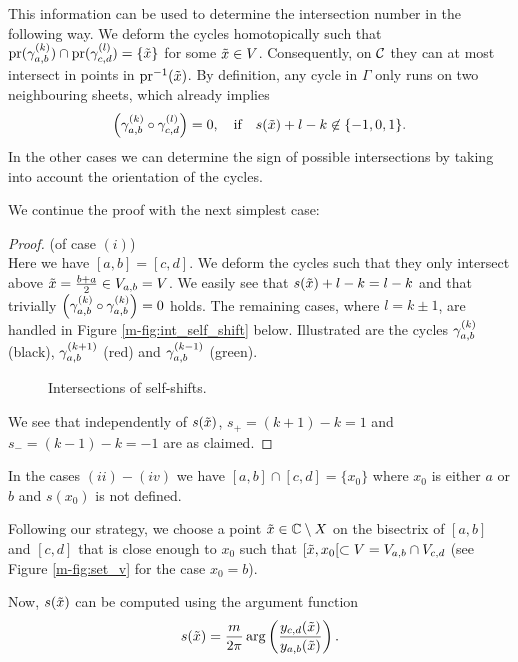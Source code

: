 \documentclass[main.tex]{subfiles}
\begin{document}
 This information can be used to determine the intersection number in the following way. We deform the cycles homotopically
 such that $\operatorname{pr}(\gamma_{a,b}^{(k)}) \cap \operatorname{pr}(\gamma_{c,d}^{(l)}) = \{ \tilde{x} \}$ for some $\tilde{x} \in V$. Consequently, on $\mathcal{C}$ they can at most intersect in
 points in $\operatorname{pr}^{-1}(\tilde{x})$. By definition, any cycle in $\Gamma$ only runs on two neighbouring sheets, which already implies
 \begin{equation}
   \left(\gamma_{a,b}^{(k)} \circ \gamma_{c,d}^{(l)}\right) = 0, \quad \text{if} \quad  s(\tilde{x})+l-k \not\in \{-1,0,1\}.
 \end{equation}
  In the other cases we can determine the
  sign of possible intersections by taking into account the orientation of the cycles.
  
 We continue the proof with the next simplest case:
 \begin{proof}\let\qed\relax (of case $(i)$) \\
 Here we have $[a,b] = [c,d]$. We deform the cycles such that they only intersect above
 $\tilde{x} = \frac{b+a}{2} \in  V_{a,b}= V$.
 We easily see that $s(\tilde{x}) + l - k = l - k$ and that trivially $\left( \gamma_{a,b}^{(k)} \circ \gamma_{a,b}^{(k)} \right) = 0$ holds. The remaining cases,
 where $l = k \pm 1$, are handled in Figure \ref{m-fig:int_self_shift} below.
   Illustrated are the cycles $\gamma_{a,b}^{(k)}$ (black),
      $\gamma_{a,b}^{(k+1)}$ (red) and $\gamma_{a,b}^{(k-1)}$ (green).
    \begin{figure}[H]
      \begin{center}
   
      \end{center}
    \caption{Intersections of self-shifts.}
    \label{fig:int_self_shift}
\end{figure}
  We see that independently of $s(\tilde{x})$, $s_+ = (k+1)-k = 1$ and $s_- = (k-1)-k = -1$ are as claimed.
 \end{proof}

  In the cases $(ii)-(iv)$ we have $[a,b] \cap [c,d] = \{ x_0 \}$ where $x_0$ is either $a$ or $b$ and $s(x_0)$ is not
  defined. 
  
 Following our strategy, we choose a point $\tilde{x} \in \mathbb{C} \setminus X$ on the bisectrix of
  $[a,b]$ and $[c,d]$ that is close enough to $x_0$ such that $[\tilde{x},x_0[ \subset V = V_{a,b} \cap V_{c,d}$ 
  (see Figure \ref{m-fig:set_v} for the case $x_0 = b$). 
  
  Now, $s(\tilde{x})$ can be computed using the argument function
  \begin{equation}\label{eq:sxt}
   s(\tilde{x}) = \frac{m}{2\pi} \arg \left( \frac{y_{c,d}(\tilde{x})}{y_{a,b}(\tilde{x})} \right).
  \end{equation}
   
\end{document}
